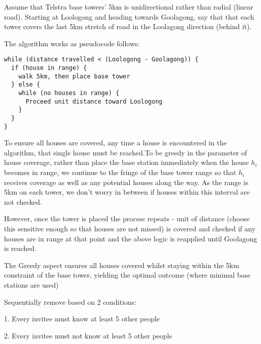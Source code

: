 \documentclass[11pt, a4paper]{article}
\begin{document}
{{{

Assume that Telstra base towers' 5km is unidirectional rather than radial (linear road).
Starting at Loologong and heading towards Goolagong, say that that each tower covers the last 5km stretch of road in the Loolagong direction (behind it).

The algorithm works as pseudocode follows:
\begin{lstlisting}[frame=single]
while (distance travelled < (Loologong - Goolagong)) {
  if (house in range) {
    walk 5km, then place base tower
  } else {
    while (no houses in range) {
      Proceed unit distance toward Loologong
    }
  }
}
\end{lstlisting}

To ensure all houses are covered, any time a house is encountered in the algorithm, that single house must be reached.To be greedy in the parameter of house coverage, rather than place the base station immediately when the house $h_i$ becomes in range, we continue to the fringe of the base tower range so that $h_i$ receives coverage as well as any potential houses along the way. As the range is 5km on each tower, we don't worry in between if houses within this interval are not checked. 

However, once the tower is placed the process repeats - unit of distance (choose this sensitive enough so that houses are not missed) is covered and checked if any houses are in range at that point and the above logic is reapplied until Goolagong is reached.

The Greedy aspect ensures all houses covered whilst staying within the 5km constraint of the base tower, yielding the optimal outcome (where minimal base stations are used)


Sequentially remove based on 2 conditions:

1. Every invitee must know at least 5 other people

2. Every invitee must not know at least 5 other people

}}}
\end{document}
